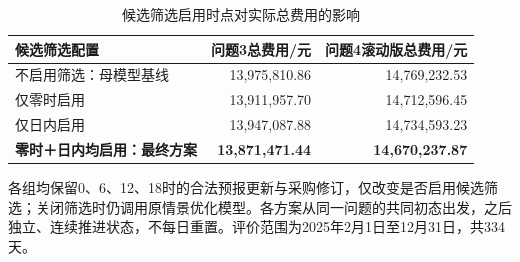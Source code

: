\begin{table}[htbp]\centering\small
\caption{候选筛选启用时点对实际总费用的影响}
\label{tab:outer_timing_ablation}
\begin{tabularx}{\linewidth}{LRR}\toprule
候选筛选配置 & 问题3总费用/元 & 问题4滚动版总费用/元\\\midrule
不启用筛选：母模型基线 & 13,975,810.86 & 14,769,232.53\\
仅零时启用 & 13,911,957.70 & 14,712,596.45\\
仅日内启用 & 13,947,087.88 & 14,734,593.23\\
\textbf{零时＋日内均启用：最终方案} & \textbf{13,871,471.44} & \textbf{14,670,237.87}\\
\bottomrule\end{tabularx}
\par\smallskip\parbox{\linewidth}{\footnotesize 各组均保留0、6、12、18时的合法预报更新与采购修订，仅改变是否启用候选筛选；关闭筛选时仍调用原情景优化模型。各方案从同一问题的共同初态出发，之后独立、连续推进状态，不每日重置。评价范围为2025年2月1日至12月31日，共334天。}
\end{table}
